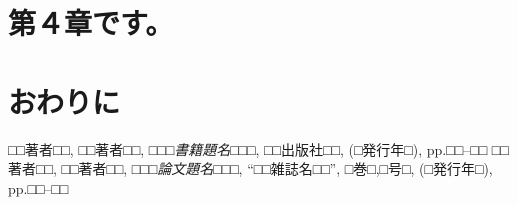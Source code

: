 \documentclass[a4jsme]{jsmepaper}
\begin{document}
\section{第４章です。}
\section*{おわりに}

{\small
\begin{thebibliography}{99}
    □□著者□□, □□著者□□,
    {\it □□□書籍題名□□□},
    □□出版社□□, (□発行年□),
    pp.□□--□□
    □□著者□□, □□著者□□,
    {\it □□□論文題名□□□},
    ``□□雑誌名□□'',
    □巻□,□号□, (□発行年□),
    pp.□□--□□
\end{thebibliography}}

\clearpage
\end{document}
